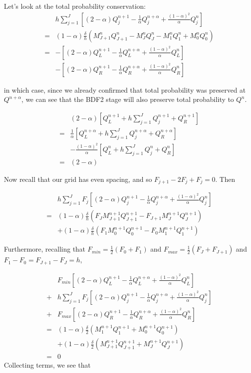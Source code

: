 \documentclass[]{rAMF2e}
\begin{document}
Let's look at the total probability conservation:
\begin{eqnarray}
& &h\sum_{j=1}^J \left[(2-\alpha)Q_j^{n+1}-\frac{1}{\alpha}Q_j^{n+\alpha}+\frac{(1-\alpha)^2}{\alpha}Q_j^n\right]\\
&=& (1-\alpha)\frac{\delta}{h}\left(M_{J+1}^{n}Q_{J+1}^{n}-M_{J}^{n}Q_{J}^{n}-
M_{1}^{n}Q_{1}^{n}+M_{0}^{n}Q_{0}^{n}\right)\\
&=&-\left[(2-\alpha)Q_L^{n+1}-\frac{1}{\alpha}Q_L^{n+\alpha}+\frac{(1-\alpha)^2}{\alpha}Q_L^n\right]\\
& &-\left[(2-\alpha)Q_R^{n+1}-\frac{1}{\alpha}Q_R^{n+\alpha}+\frac{(1-\alpha)^2}{\alpha}Q_R^n\right]
\end{eqnarray}

in which case, since we already confirmed that total probability was preserved at $Q^{n+\alpha}$, we can see that the BDF2 stage will also preserve total probability to $Q^n$.

\begin{eqnarray}
& &(2-\alpha)\left[Q_L^{n+1} + h\sum_{j=1}^J Q_j^{n+1} +Q_R^{n+1}\right]\\
&=&\frac{1}{\alpha}\left[Q_L^{n+\alpha} + h\sum_{j=1}^J Q_j^{n+\alpha} +Q_R^{n+\alpha}\right]\\
& &-\frac{(1-\alpha)^2}{\alpha}\left[Q_L^{n} + h\sum_{j=1}^J Q_j^{n} +Q_R^{n}\right]\\
&=& (2-\alpha)
\end{eqnarray}

Now recall that our grid has even spacing, and so $F_{j+1}-2F_j+F_j=0$. Then

\begin{eqnarray}
& &h\sum_{j=1}^J F_j\left[(2-\alpha)Q_j^{n+1}-\frac{1}{\alpha}Q_j^{n+\alpha}+\frac{(1-\alpha)^2}{\alpha}Q_j^n\right]\\
&=&(1-\alpha)\frac{\delta}{h}\left(F_JM_{J+1}^{n+1}Q_{J+1}^{n+1}-F_{J+1}M_J^{n+1}Q_J^{n+1}\right)\\
& &+ (1-\alpha)\frac{\delta}{h}\left(F_1M_{0}^{n+1}Q_{0}^{n+1}-F_{0}M_1^{n+1}Q_1^{n+1}\right)
\end{eqnarray}

Furthermore, recalling that $F_{min}=\frac{1}{2}(F_0+F_1)$ and $F_{max}=\frac{1}{2}(F_J+F_{J+1})$ and $F_1-F_0=F_{J+1}-F_{J}=h$, 

\begin{eqnarray}
& &F_{min}\left[(2-\alpha)Q_L^{n+1}-\frac{1}{\alpha}Q_L^{n+\alpha}+\frac{(1-\alpha)^2}{\alpha}Q_L^n\right]\\
&+& h\sum_{j=1}^J F_j\left[(2-\alpha)Q_j^{n+1}-\frac{1}{\alpha}Q_j^{n+\alpha}+\frac{(1-\alpha)^2}{\alpha}Q_j^n\right]\\
&+&F_{max}\left[(2-\alpha)Q_R^{n+1}-\frac{1}{\alpha}Q_R^{n+\alpha}+\frac{(1-\alpha)^2}{\alpha}Q_R^n\right]\\
&=&(1-\alpha)\frac{\delta}{2}\left(M^{n+1}_1Q_1^{n+1}+M_0^{n+1}Q_0^{n+1}\right)\\
& &+(1-\alpha)\frac{\delta}{2}\left(M^{n+1}_{J+1}Q_{J+1}^{n+1}+M_J^{n+1}Q_J^{n+1}\right)\\
&=&0
\end{eqnarray}
Collecting terms, we see that
\end{document}
